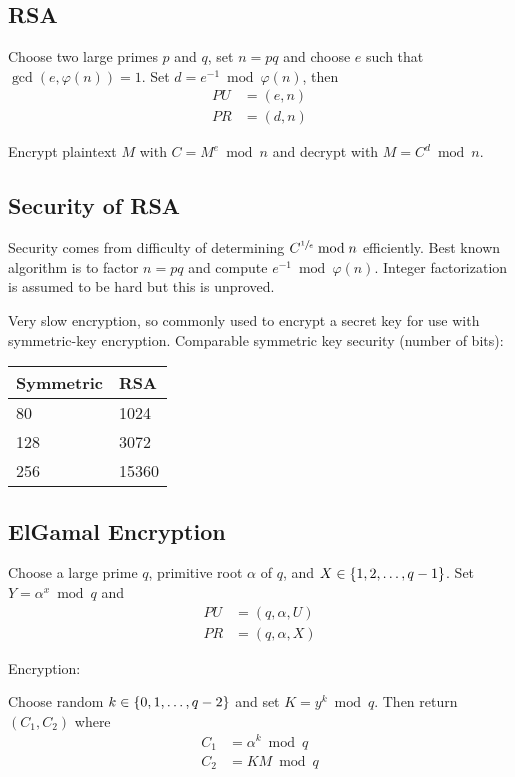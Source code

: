 \documentclass[final]{article}
\begin{document}
\subsection{RSA}
Choose two large primes $p$ and $q$, set $n=pq$ and choose $e$ such that $\gcd(e, \varphi(n)) = 1$. Set $d=e^{-1}\bmod\varphi(n)$, then
\begin{align*}PU&=(e, n)\\PR&=(d, n)\end{align*}

Encrypt plaintext $M$ with $C=M^e \bmod{n}$ and decrypt with $M = C^d\bmod{n}$.

\subsection{Security of RSA}
Security comes from difficulty of determining $C^{\sfrac{1}{e}}\bmod{n}$ efficiently. Best known algorithm is to factor $n=pq$ and compute $e^{-1}\bmod{\varphi(n)}$. Integer factorization is assumed to be hard but this is unproved.

Very slow encryption, so commonly used to encrypt a secret key for use with symmetric-key encryption. Comparable symmetric key security (number of bits):

\begin{tabular}{ll}
    Symmetric & RSA   \\\toprule
    80        & 1024  \\
    128       & 3072  \\
    256       & 15360 \\\bottomrule
\end{tabular}

\subsection{ElGamal Encryption}
Choose a large prime $q$, primitive root $\alpha$ of $q$, and $X \in \left\lbrace1, 2, \hdots, q - 1\right\rbrace$. Set $Y = \alpha^x\bmod{q}$ and \begin{align*}PU&=(q,\alpha,U)\\PR&=(q,\alpha,X)\end{align*}

Encryption:

Choose random $k\in\left\lbrace0,1,\hdots, q-2\right\rbrace$ and set $K=y^k\bmod{q}$. Then return $(C_1, C_2)$ where \begin{align*}C_1&=\alpha^k\bmod{q}\\C_2&=KM\bmod{q}\end{align*}
\end{document}
